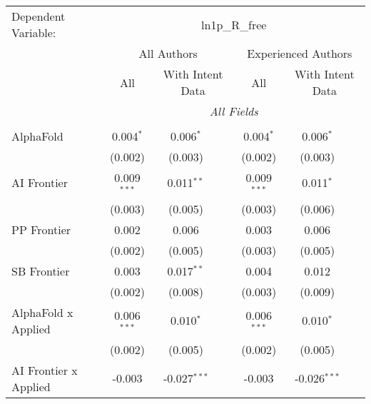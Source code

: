 \begingroup
\centering
\begin{tabular}{lcccccc}
   \tabularnewline \midrule \midrule
   Dependent Variable: & \multicolumn{6}{c}{ln1p\_R\_free}\\
 & \multicolumn{3}{c}{All Authors} & \multicolumn{3}{c}{Experienced Authors} \\
\cmidrule(lr){2-4} \cmidrule(lr){5-7}
 & \multicolumn{1}{c}{All} & \multicolumn{2}{c}{With Intent Data} & \multicolumn{1}{c}{All} & \multicolumn{2}{c}{With Intent Data} \\
\cmidrule(lr){2-2} \cmidrule(lr){3-4} \cmidrule(lr){5-5} \cmidrule(lr){6-7}
 & \multicolumn{6}{c}{\textit{All Fields}} \\ \\
   AlphaFold                      & 0.004$^{*}$   & 0.006$^{*}$    &                & 0.004$^{*}$    & 0.006$^{*}$    &   \\   
                                  & (0.002)       & (0.003)        &                & (0.002)        & (0.003)        &   \\   
   AI Frontier                    & 0.009$^{***}$ & 0.011$^{**}$   &                & 0.009$^{***}$  & 0.011$^{*}$    &   \\   
                                  & (0.003)       & (0.005)        &                & (0.003)        & (0.006)        &   \\   
   PP Frontier                    & 0.002         & 0.006          &                & 0.003          & 0.006          &   \\   
                                  & (0.002)       & (0.005)        &                & (0.003)        & (0.005)        &   \\   
   SB Frontier                    & 0.003         & 0.017$^{**}$   &                & 0.004          & 0.012          &   \\   
                                  & (0.002)       & (0.008)        &                & (0.003)        & (0.009)        &   \\   
   AlphaFold x Applied            & 0.006$^{***}$ & 0.010$^{*}$    &                & 0.006$^{***}$  & 0.010$^{*}$    &   \\   
                                  & (0.002)       & (0.005)        &                & (0.002)        & (0.005)        &   \\   
   AI Frontier x Applied          & -0.003        & -0.027$^{***}$ &                & -0.003         & -0.026$^{***}$ &   \\   

\end{tabular}
